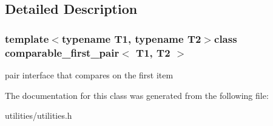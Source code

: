 \subsection{Detailed Description}
\subsubsection*{template$<$typename T1, typename T2$>$class comparable\-\_\-first\-\_\-pair$<$ T1, T2 $>$}

pair interface that compares on the first item 

The documentation for this class was generated from the following file\-:\begin{DoxyCompactItemize}
\item 
utilities/utilities.\-h\end{DoxyCompactItemize}
